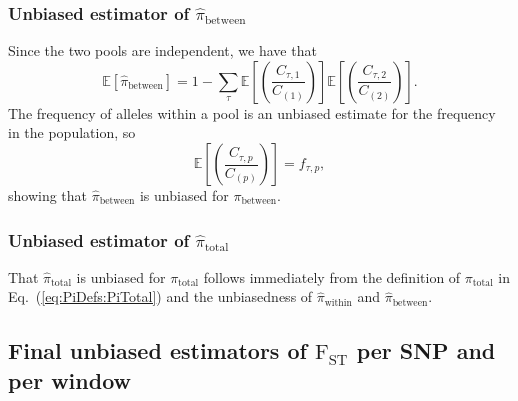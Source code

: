 \documentclass[a4paper,9pt,DIV=14]{scrartcl}
\newcounter{todo}
\newcommand\todo[1]{}
\newcommand\eqnref[1]{Eq.~(\ref{#1})}
\begin{document}

\subsubsection*{Unbiased estimator of \texorpdfstring{$\widehat{\pi}_\text{between}$}{Pi Between}}
\label{supp:sec:FST:sub:EstimatorsPi:sub:PiBetween}

\todo{I think some of the capital C's here and in surrounding sections should be lower case.}

Since the two pools are independent, we have that
\[
\mathbb{E}\left[\widehat{\pi}_\text{between}\right] = 1- \sum_\tau \mathbb{E}\left[\left(\frac{C_{\tau,1}}{C_{(1)}}\right)\right]\mathbb{E}\left[\left(\frac{C_{\tau,2}}{C_{(2)}}\right)\right].
\]
The frequency of alleles within a pool is an unbiased estimate for the frequency in the population, so
\[
\mathbb{E}\left[\left(\frac{C_{\tau,p}}{C_{(p)}}\right)\right] = f_{\tau, p},
\]
showing that $\widehat{\pi}_\text{between}$ is unbiased for $\pi_\text{between}$.


\subsubsection*{Unbiased estimator of \texorpdfstring{$\widehat{\pi}_\text{total}$}{Pi Total}}
\label{supp:sec:FST:sub:EstimatorsPi:sub:PiTotal}

That $\widehat{\pi}_\text{total}$ is unbiased for $\pi_\text{total}$ follows immediately from the definition of $\pi_\text{total}$ in \eqnref{eq:PiDefs:PiTotal} and the unbiasedness of $\widehat{\pi}_\text{within}$ and $\widehat{\pi}_\text{between}$.


\subsection{Final unbiased estimators of \texorpdfstring{$\text{F}_\text{ST}$}{FST} per SNP and per window}
\label{supp:sec:FST:sub:EstimatorFST}
\end{document}
